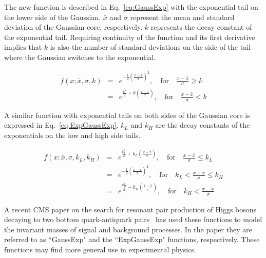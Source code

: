 \documentclass[10pt,letterpaper]{article}
\begin{document}
The new function is described in Eq.~\ref{eq:GaussExp} with the exponential tail on the lower side of the Gaussian. $\bar{x}$ and $\sigma$ represent the mean and standard deviation of the Gaussian core, respectively. $k$ represents the decay constant of the exponential tail. Requiring continuity of the function and its first derivative implies that $k$ is also the number of standard deviations on the side of the tail where the Gaussian switches to the exponential.

\begin{eqnarray}
\label{eq:GaussExp}
f(x; \bar{x}, \sigma, k) &=& e^{-\frac{1}{2}\left(\frac{x-\bar{x}}{\sigma}\right)^2}, \quad \textrm{for} \quad \frac{x-\bar{x}}{\sigma} \geq k  \\
                         &=& e^{\frac{k^2}{2}+k\left(\frac{x-\bar{x}}{\sigma}\right)}, \quad \textrm{for} \quad \frac{x-\bar{x}}{\sigma} < k \nonumber
\end{eqnarray}

A similar function with exponential tails on both sides of the Gaussian core is expressed in Eq.~\ref{eq:ExpGaussExp}. $k_L$ and $k_H$ are the decay constants of the exponentials on the low and high side tails.

\begin{eqnarray}
\label{eq:ExpGaussExp}
f(x; \bar{x}, \sigma, k_L, k_H) &=& e^{\frac{k_L^2}{2}+k_L\left(\frac{x-\bar{x}}{\sigma}\right)}, \quad \textrm{for} \quad \frac{x-\bar{x}}{\sigma} \leq k_L \\
                         &=& e^{-\frac{1}{2}\left(\frac{x-\bar{x}}{\sigma}\right)^2}, \quad \textrm{for} \quad k_L <  \frac{x-\bar{x}}{\sigma} \leq k_H  \nonumber \\
                         &=& e^{\frac{k_H^2}{2}-k_H\left(\frac{x-\bar{x}}{\sigma}\right)}, \quad \textrm{for} \quad k_H < \frac{x-\bar{x}}{\sigma} \nonumber
\end{eqnarray}

A recent CMS paper on the search for resonant pair production of Higgs bosons decaying to two bottom quark-antiquark pairs~\cite{Khachatryan2015560} has used these functions to model the invariant masses of signal and background processes. In the paper they are referred to as ``GaussExp" and the ``ExpGaussExp" functions, respectively. These functions may find more general use in experimental physics.



\end{document}
